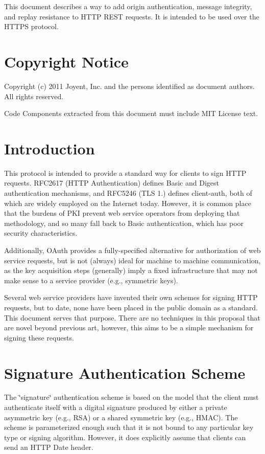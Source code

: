 This document describes a way to add origin authentication, message integrity, and replay resistance to H\+T\+TP R\+E\+ST requests. It is intended to be used over the H\+T\+T\+PS protocol.

\section*{Copyright Notice}

Copyright (c) 2011 Joyent, Inc. and the persons identified as document authors. All rights reserved.

Code Components extracted from this document must include M\+IT License text.

\section*{Introduction}

This protocol is intended to provide a standard way for clients to sign H\+T\+TP requests. R\+F\+C2617 (H\+T\+TP Authentication) defines Basic and Digest authentication mechanisms, and R\+F\+C5246 (T\+LS 1.) defines client-\/auth, both of which are widely employed on the Internet today. However, it is common place that the burdens of P\+KI prevent web service operators from deploying that methodology, and so many fall back to Basic authentication, which has poor security characteristics.

Additionally, O\+Auth provides a fully-\/specified alternative for authorization of web service requests, but is not (always) ideal for machine to machine communication, as the key acquisition steps (generally) imply a fixed infrastructure that may not make sense to a service provider (e.\+g., symmetric keys).

Several web service providers have invented their own schemes for signing H\+T\+TP requests, but to date, none have been placed in the public domain as a standard. This document serves that purpose. There are no techniques in this proposal that are novel beyond previous art, however, this aims to be a simple mechanism for signing these requests.

\section*{Signature Authentication Scheme}

The \char`\"{}signature\char`\"{} authentication scheme is based on the model that the client must authenticate itself with a digital signature produced by either a private asymmetric key (e.\+g., R\+SA) or a shared symmetric key (e.\+g., H\+M\+AC). The scheme is parameterized enough such that it is not bound to any particular key type or signing algorithm. However, it does explicitly assume that clients can send an H\+T\+TP {\ttfamily Date} header.

